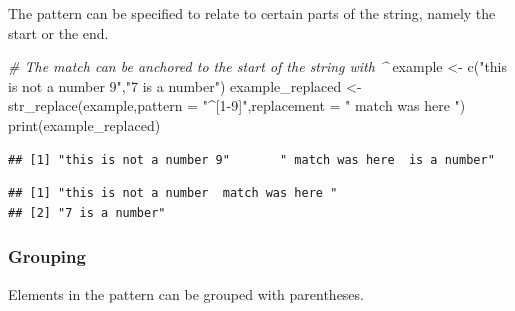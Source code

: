 \documentclass[
]{book}
\newenvironment{Shaded}{\begin{snugshade}}{\end{snugshade}}
\newcommand{\AttributeTok}[1]{\textcolor[rgb]{0.77,0.63,0.00}{#1}}
\newcommand{\CommentTok}[1]{\textcolor[rgb]{0.56,0.35,0.01}{\textit{#1}}}
\newcommand{\FunctionTok}[1]{\textcolor[rgb]{0.00,0.00,0.00}{#1}}
\newcommand{\NormalTok}[1]{#1}
\newcommand{\OtherTok}[1]{\textcolor[rgb]{0.56,0.35,0.01}{#1}}
\newcommand{\StringTok}[1]{\textcolor[rgb]{0.31,0.60,0.02}{#1}}
\begin{document}
The pattern can be specified to relate to certain parts of the string, namely the start or the end.

\begin{Shaded}
\begin{Highlighting}[]
\CommentTok{\# The match can be anchored to the start of the string with \^{}}
\NormalTok{example }\OtherTok{\textless{}{-}} \FunctionTok{c}\NormalTok{(}\StringTok{"this is not a number 9"}\NormalTok{,}\StringTok{"7 is a number"}\NormalTok{)}
\NormalTok{example\_replaced }\OtherTok{\textless{}{-}} \FunctionTok{str\_replace}\NormalTok{(example,}\AttributeTok{pattern =} \StringTok{"\^{}[1{-}9]"}\NormalTok{,}\AttributeTok{replacement =} \StringTok{" match was here "}\NormalTok{)}
\FunctionTok{print}\NormalTok{(example\_replaced)}
\end{Highlighting}
\end{Shaded}

\begin{verbatim}
## [1] "this is not a number 9"       " match was here  is a number"
\end{verbatim}

\begin{Shaded}
\end{Shaded}

\begin{verbatim}
## [1] "this is not a number  match was here "
## [2] "7 is a number"
\end{verbatim}

\hypertarget{grouping}{%
\subsubsection{Grouping}\label{grouping}}

Elements in the pattern can be grouped with parentheses.
\end{document}
